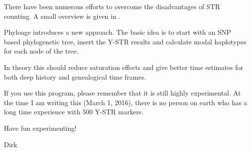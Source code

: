 There have been numerous efforts to overcome the disadvantages
of STR counting. A small overview is given in \cite{Ham15}.

Phyloage introduces a new approach. The basic idea is to
start with an SNP based phylogenetic tree, insert the Y-STR
results and calculate modal haplotypes for each node of the
tree. 

In theory this should reduce saturation effects and give
better time estimates for both deep history and genealogical
time frames.

If you use this program, please remember that it is still
highly experimental. At the time I am writing this (March 1,
2016), there is no person on earth who has a long time
experience with 500 Y-STR markers.

\vspace{1em}\noindent
Have fun experimenting!

\vspace{1em} Dirk



